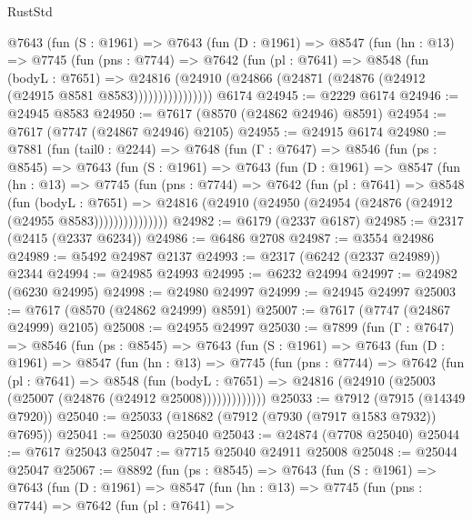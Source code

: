 \begin{lexlean}{RustStd}
\begin{coremodule}
          @7643
            (fun (S : @1961) =>
            @7643
              (fun (D : @1961) =>
              @8547
                (fun (hn : @13) =>
                @7745
                  (fun (pns : @7744) =>
                  @7642
                    (fun (pl : @7641) =>
                    @8548
                      (fun (bodyL : @7651) =>
                      @24816
                        (@24910 (@24866 (@24871 (@24876 (@24912 (@24915 @8581 @8583))))))))))))))))
    @6174
@24945 := @2229 @6174
@24946 := @24945 @8583
@24950 := @7617 (@8570 (@24862 @24946) @8591)
@24954 := @7617 (@7747 (@24867 @24946) @2105)
@24955 := @24915 @6174
@24980 := @7881
    (fun (tail0 : @2244) =>
    @7648
      (fun (Γ : @7647) =>
      @8546
        (fun (ps : @8545) =>
        @7643
          (fun (S : @1961) =>
          @7643
            (fun (D : @1961) =>
            @8547
              (fun (hn : @13) =>
              @7745
                (fun (pns : @7744) =>
                @7642
                  (fun (pl : @7641) =>
                  @8548
                    (fun (bodyL : @7651) =>
                    @24816 (@24910 (@24950 (@24954 (@24876 (@24912 (@24955 @8583)))))))))))))))
@24982 := @6179 (@2337 @6187)
@24985 := @2317 (@2415 (@2337 @6234))
@24986 := @6486 @2708
@24987 := @3554 @24986
@24989 := @5492 @24987 @2137
@24993 := @2317 (@6242 (@2337 @24989)) @2344
@24994 := @24985 @24993
@24995 := @6232 @24994
@24997 := @24982 (@6230 @24995)
@24998 := @24980 @24997
@24999 := @24945 @24997
@25003 := @7617 (@8570 (@24862 @24999) @8591)
@25007 := @7617 (@7747 (@24867 @24999) @2105)
@25008 := @24955 @24997
@25030 := @7899
    (fun (Γ : @7647) =>
    @8546
      (fun (ps : @8545) =>
      @7643
        (fun (S : @1961) =>
        @7643
          (fun (D : @1961) =>
          @8547
            (fun (hn : @13) =>
            @7745
              (fun (pns : @7744) =>
              @7642
                (fun (pl : @7641) =>
                @8548
                  (fun (bodyL : @7651) =>
                  @24816 (@24910 (@25003 (@25007 (@24876 (@24912 @25008)))))))))))))
@25033 := @7912 (@7915 (@14349 @7920))
@25040 := @25033 (@18682 (@7912 (@7930 (@7917 @1583 @7932)) @7695))
@25041 := @25030 @25040
@25043 := @24874 (@7708 @25040)
@25044 := @7617 @25043
@25047 := @7715 @25040 @24911 @25008
@25048 := @25044 @25047
@25067 := @8892
    (fun (ps : @8545) =>
    @7643
      (fun (S : @1961) =>
      @7643
        (fun (D : @1961) =>
        @8547
          (fun (hn : @13) =>
          @7745
            (fun (pns : @7744) =>
            @7642
              (fun (pl : @7641) =>

\end{coremodule}
\end{lexlean}
